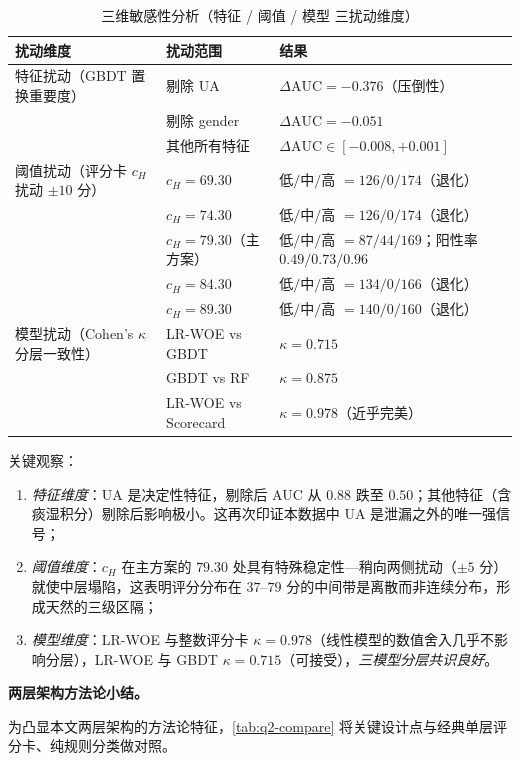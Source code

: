 \documentclass{MathorCupmodeling}
\providecommand{\tightlist}{%
  \setlength{\itemsep}{0pt}\setlength{\parskip}{0pt}}
\begin{document}
\begin{table}[H]
\centering\small
\caption{三维敏感性分析（特征 / 阈值 / 模型 三扰动维度）}\label{tab:q2-robust}
\begin{tabularx}{\linewidth}{@{}l l L@{}}
\toprule
扰动维度 & 扰动范围 & 结果 \\
\midrule
特征扰动（GBDT 置换重要度）
  & 剔除 UA    & $\Delta\mathrm{AUC}=-0.376$（压倒性）\\
  & 剔除 gender & $\Delta\mathrm{AUC}=-0.051$ \\
  & 其他所有特征 & $\Delta\mathrm{AUC}\in[-0.008, +0.001]$ \\
\midrule
阈值扰动（评分卡 $c_H$ 扰动 $\pm 10$ 分）
  & $c_H=69.30$ & 低$/$中$/$高 $=126/0/174$（退化）\\
  & $c_H=74.30$ & 低$/$中$/$高 $=126/0/174$（退化）\\
  & $c_H=79.30$（主方案） & 低$/$中$/$高 $=87/44/169$；阳性率 $0.49/0.73/0.96$ \\
  & $c_H=84.30$ & 低$/$中$/$高 $=134/0/166$（退化）\\
  & $c_H=89.30$ & 低$/$中$/$高 $=140/0/160$（退化）\\
\midrule
模型扰动（Cohen's $\kappa$ 分层一致性）
  & LR-WOE vs GBDT & $\kappa=0.715$ \\
  & GBDT vs RF     & $\kappa=0.875$ \\
  & LR-WOE vs Scorecard & $\kappa=0.978$（近乎完美） \\
\bottomrule
\end{tabularx}
\end{table}

关键观察：
\begin{enumerate}
\def\labelenumi{(\arabic{enumi})}
\tightlist
\item \emph{特征维度}：UA 是决定性特征，剔除后 AUC 从 $0.88$ 跌至 $0.50$；其他特征（含痰湿积分）剔除后影响极小。这再次印证本数据中 UA 是泄漏之外的唯一强信号；
\item \emph{阈值维度}：$c_H$ 在主方案的 $79.30$ 处具有特殊稳定性---稍向两侧扰动（$\pm 5$ 分）就使中层塌陷，这表明评分分布在 $37$--$79$ 分的中间带是离散而非连续分布，形成天然的三级区隔；
\item \emph{模型维度}：LR-WOE 与整数评分卡 $\kappa=0.978$（线性模型的数值舍入几乎不影响分层），LR-WOE 与 GBDT $\kappa=0.715$（可接受），\emph{三模型分层共识良好}。
\end{enumerate}

\noindent\textbf{两层架构方法论小结。}

为凸显本文两层架构的方法论特征，\cref{tab:q2-compare} 将关键设计点与经典单层评分卡、纯规则分类做对照。
\end{document}
